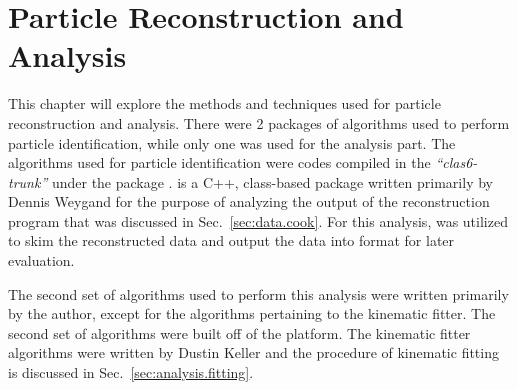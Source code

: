 \begin{flushleft}
\begin{flushleft}

\end{flushleft}
\end{flushleft}\chapter{Particle Reconstruction and Analysis}\label{sec:analysis}

This chapter will explore the methods and techniques used for particle reconstruction and analysis. There were 2 packages of algorithms used to perform particle identification, while only one was used for the analysis part. The algorithms used for particle identification were codes compiled in the \emph{``clas6-trunk''} under the package .  is a C++, class-based package written primarily by Dennis Weygand for the purpose of analyzing the output of the reconstruction program that was discussed in Sec.~\ref{sec:data.cook}. For this analysis,  was utilized to skim the reconstructed data and output the data into  format for later evaluation. 

The second set of algorithms used to perform this analysis were written primarily by the author, except for the algorithms pertaining to the kinematic fitter. The second set of algorithms were built off of the  platform. The kinematic fitter algorithms were written by Dustin Keller and the procedure of kinematic fitting is discussed in Sec.~\ref{sec:analysis.fitting}. 









 
%